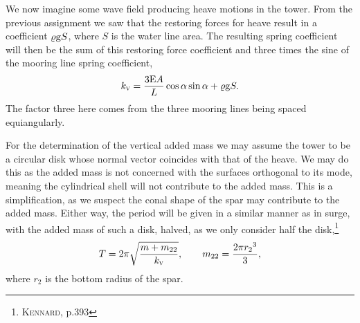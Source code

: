 We now imagine some wave field producing heave motions in the tower.
From the previous assignment we saw that the restoring forces for heave result in a coefficient $\varrho\mathrm{g} S$, where $S$ is the water line area.
The resulting spring coefficient will then be the sum of this restoring force coefficient and three times the sine of the mooring line spring coefficient,
\[
    k_{\textsc{v}} = \frac{3 \mathrm{E} A}{L}\cos{\alpha}\sin{\alpha} + \varrho\mathrm{g} S.
\]
The factor three here comes from the three mooring lines being spaced equiangularly.

For the determination of the vertical added mass we may assume the tower to be a circular disk whose normal vector coincides with that of the heave.
We may do this as the added mass is not concerned with the surfaces orthogonal to its mode, meaning the cylindrical shell will not contribute to the added mass.
This is a simplification, as we suspect the conal shape of the spar may contribute to the added mass.
Either way, the period will be given in a similar manner as in surge, with the added mass of such a disk, halved, as we only consider half the disk,\footnote{\cite{kennard1967irrotational} \textsc{Kennard}, p.393}
\[
    T = 2\pi \sqrt{\frac{m + m_{22}}{k_{\textsc{v}}}}, \qquad m_{22} = \frac{2 \pi {r_2}^3}{3},
\]
where $r_2$ is the bottom radius of the spar.
